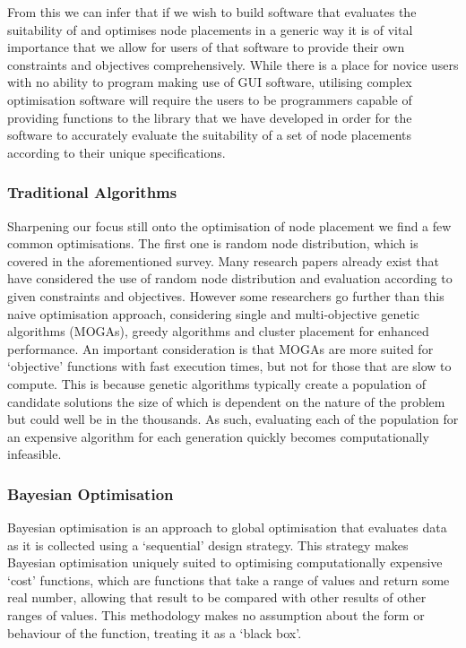 		From this we can infer that if we wish to build software that evaluates the suitability of and optimises node placements in a generic way it is of vital importance that we allow for users of that software to provide their own constraints and objectives comprehensively. While there is a place for novice users with no ability to program making use of GUI software, utilising complex optimisation software will require the users to be programmers capable of providing functions to the library that we have developed in order for the software to accurately evaluate the suitability of a set of node placements according to their unique specifications.

		\subsubsection{Traditional Algorithms}
			\label{sec:related_work_traditional}
			Sharpening our focus still onto the optimisation of node placement we find a few common optimisations. The first one is random node distribution, which is covered in the aforementioned survey.\cite{younis2020placementsurvey} Many research papers already exist that have considered the use of random node distribution and evaluation\cite{wang2010coverage} according to given constraints and objectives. However some researchers go further than this naive optimisation approach, considering single and multi-objective genetic algorithms (MOGAs)\cite{zhang2017flexible}, greedy algorithms and cluster placement for enhanced performance\cite{bi2015node}. An important consideration is that MOGAs are more suited for `objective' functions with fast execution times, but not for those that are slow to compute. This is because genetic algorithms typically create a population of candidate solutions\cite{banzhaf1998genetic} the size of which is dependent on the nature of the problem but could well be in the thousands. As such, evaluating each of the population for an expensive algorithm for each generation quickly becomes computationally infeasible.

		\subsubsection{Bayesian Optimisation} 
			\label{sec:related_work_bayesian} 
			Bayesian optimisation is an approach to global optimisation that evaluates data as it is collected using a `sequential' design strategy\cite{movckus1975bayesian}. This strategy makes Bayesian optimisation uniquely suited to optimising computationally expensive `cost' functions,\cite{brochu2010tutorial} which are functions that take a range of values and return some real number, allowing that result to be compared with other results of other ranges of values. This methodology makes no assumption about the form or behaviour of the function, treating it as a `black box'.

